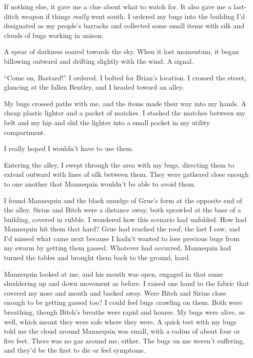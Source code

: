 If nothing else, it gave me a clue about what to watch for.  It also gave me a last-ditch weapon if things \emph{really} went south.  I ordered my bugs into the building I'd designated as my people's barracks and collected some small items with silk and clouds of bugs working in unison.



A spear of darkness soared towards the sky.  When it lost momentum, it began billowing outward and drifting slightly with the wind. A signal.



``Come on, Bastard!'' I ordered.  I bolted for Brian's location.  I crossed the street, glancing at the fallen Bentley, and I headed toward an alley.



My bugs crossed paths with me, and the items made their way into my hands.  A cheap plastic lighter and a packet of matches.  I stashed the matches between my belt and my hip and slid the lighter into a small pocket in my utility compartment.



I really hoped I wouldn't have to use them.



Entering the alley, I swept through the area with my bugs, directing them to extend outward with lines of silk between them.  They were gathered close enough to one another that Mannequin wouldn't be able to avoid them.



I found Mannequin and the black smudge of Grue's form at the opposite end of the alley.  Sirius and Bitch were a distance away, both sprawled at the base of a building, covered in rubble.  I wondered how this scenario had unfolded.  How had Mannequin hit them that hard?  Grue had reached the roof, the last I saw, and I'd missed what came next because I hadn't wanted to lose precious bugs from my swarm by getting them gassed.  Whatever had occurred, Mannequin had turned the tables and brought them back to the ground, hard.



Mannequin looked at me, and his mouth was open, engaged in that same shuddering up and down movement as before.  I raised one hand to the fabric that covered my nose and mouth and backed away.  Were Bitch and Sirius close enough to be getting gassed too?  I could feel bugs crawling on them.  Both were breathing, though Bitch's breaths were rapid and hoarse.  My bugs were alive, as well, which meant they were safe where they were.  A quick test with my bugs told me the cloud around Mannequin was small, with a radius of about four or five feet.  There was no gas around me, either.  The bugs on me weren't suffering, and they'd be the first to die or feel symptoms.




